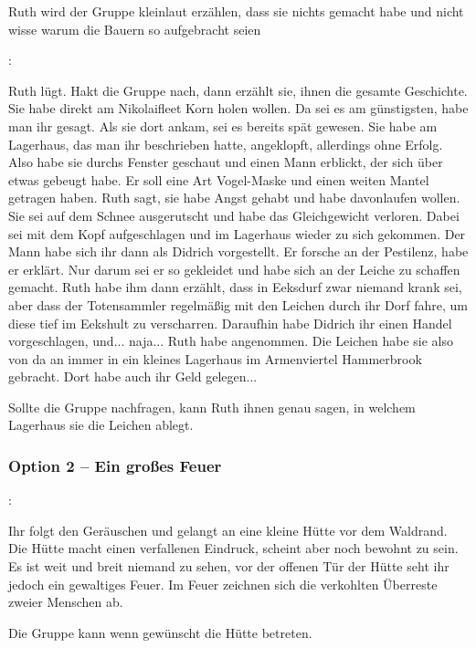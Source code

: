 Ruth wird der Gruppe kleinlaut erzählen, dass sie nichts gemacht habe und nicht wisse warum die Bauern so aufgebracht seien

:

Ruth lügt. Hakt die Gruppe nach, dann erzählt sie, ihnen die gesamte Geschichte. \\
Sie habe direkt am Nikolaifleet Korn holen wollen. Da sei es am günstigsten, habe man ihr gesagt. Als sie dort ankam, sei es bereits spät gewesen. Sie habe am Lagerhaus, das man ihr beschrieben hatte, angeklopft, allerdings ohne Erfolg. Also habe sie durchs Fenster geschaut und einen Mann erblickt, der sich über etwas gebeugt habe. Er soll eine Art Vogel-Maske und einen weiten Mantel getragen haben. Ruth sagt, sie habe Angst gehabt und habe davonlaufen wollen. Sie sei auf dem Schnee ausgerutscht und habe das Gleichgewicht verloren. Dabei sei mit dem Kopf aufgeschlagen und im Lagerhaus wieder zu sich gekommen. Der Mann habe sich ihr dann als Didrich vorgestellt. Er forsche an der Pestilenz, habe er erklärt. Nur darum sei er so gekleidet und habe sich an der Leiche zu schaffen gemacht. Ruth habe ihm dann erzählt, dass in Eeksdurf zwar niemand krank sei, aber dass der Totensammler regelmäßig mit den Leichen durch ihr Dorf fahre, um diese tief im Eekshult zu verscharren. Daraufhin habe Didrich ihr einen Handel vorgeschlagen, und... naja... Ruth habe angenommen. 
Die Leichen habe sie also von da an immer in ein kleines Lagerhaus im Armenviertel Hammerbrook gebracht. Dort habe auch ihr Geld gelegen...

Sollte die Gruppe nachfragen, kann Ruth ihnen genau sagen, in welchem Lagerhaus sie die Leichen ablegt.

\subsubsection*{Option 2 – Ein großes Feuer}
\label{feuer}

:

Ihr folgt den Geräuschen und gelangt an eine kleine Hütte vor dem Waldrand. Die Hütte macht einen verfallenen Eindruck, scheint aber noch bewohnt zu sein. Es ist weit und breit niemand zu sehen, vor der offenen Tür der Hütte seht ihr jedoch ein gewaltiges Feuer. Im Feuer zeichnen sich die verkohlten Überreste zweier Menschen ab.

Die Gruppe kann wenn gewünscht die Hütte betreten.

